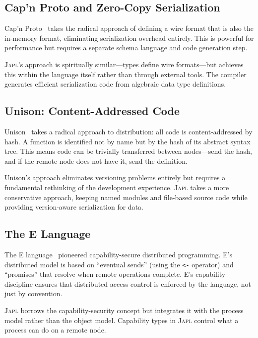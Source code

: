 \documentclass[11pt,a4paper]{article}
\newcommand{\japl}{\textsc{Japl}}
\begin{document}
\subsection{Cap'n Proto and Zero-Copy Serialization}

Cap'n Proto~\citep{capnproto2013} takes the radical approach of defining a
wire format that is also the in-memory format, eliminating serialization
overhead entirely. This is powerful for performance but requires a separate
schema language and code generation step.

\japl{}'s approach is spiritually similar---types define wire formats---but
achieves this within the language itself rather than through external tools.
The compiler generates efficient serialization code from algebraic data type
definitions.

\subsection{Unison: Content-Addressed Code}

Unison~\citep{chiusano2019unison} takes a radical approach to distribution:
all code is content-addressed by hash. A function is identified not by name
but by the hash of its abstract syntax tree. This means code can be
trivially transferred between nodes---send the hash, and if the remote node
does not have it, send the definition.

Unison's approach eliminates versioning problems entirely but requires a
fundamental rethinking of the development experience. \japl{} takes a more
conservative approach, keeping named modules and file-based source code
while providing version-aware serialization for data.

\subsection{The E Language}

The E language~\citep{miller2006robust} pioneered capability-secure
distributed programming. E's distributed model is based on ``eventual
sends'' (using the \texttt{<-} operator) and ``promises'' that resolve
when remote operations complete. E's capability discipline ensures that
distributed access control is enforced by the language, not just by
convention.

\japl{} borrows the capability-security concept but integrates it with
the process model rather than the object model. Capability types in \japl{}
control what a process can do on a remote node.
\end{document}
